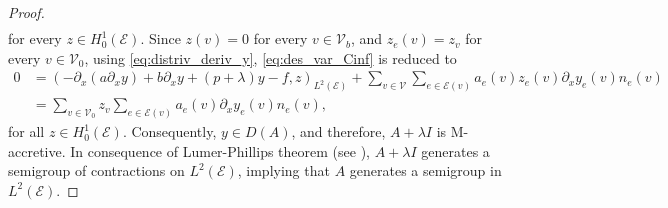 \documentclass[a4paper, 10pt, english]{article}
\begin{document}
\begin{proof}
\begin{align}
\end{align}
for every $z\in H^1_0(\mathcal{E})$. Since $z(v)=0$ for every $v\in \mathcal{V}_b$, and $z_e(v)=z_v$ for every $v\in\mathcal{V}_0$, using \eqref{eq:distriv_deriv_y}, \eqref{eq:des_var_Cinf} is reduced to
\begin{align*}
     0&=(-\partial_x(a\partial_x y) + b\partial_x y +(p+\lambda)y -f,z)_{L^2(\mathcal{E})}+\sum_{v\in \mathcal{V}}\sum_{e\in\mathcal{E}(v)}a_e(v)z_e(v)\partial_x y_e(v)n_e(v)\\
     &=  \sum_{v\in \mathcal{V}_0}z_v\sum_{e\in\mathcal{E}(v)} a_e(v)\partial_x y_e(v)n_e(v),
\end{align*}
for all $z\in H^1_0(\mathcal{E})$. Consequently, $y\in D(A)$, and therefore, $A+\lambda I$ is M-accretive. In consequence of Lumer-Phillips theorem (see \cite[Theorem 2.8]{Bensoussan}), $A+\lambda I$ generates a semigroup of contractions on $L^2(\mathcal{E})$, implying that $A$ generates a semigroup in $L^2(\mathcal{E})$.


\end{proof}
\end{document}
